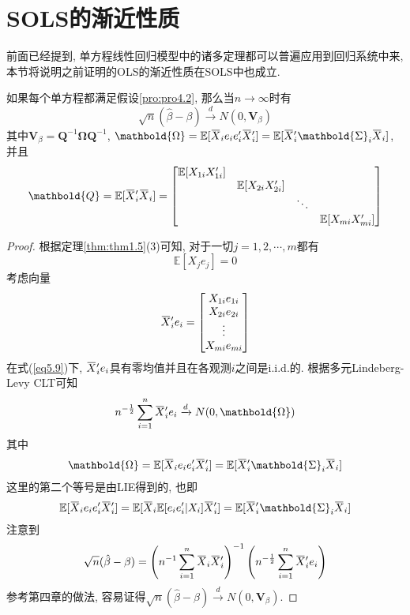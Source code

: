 \documentclass[cn, 12pt, math=mtpro2, bibstyle=apa, blue, twocol]{elegantbook}
\newcommand{\E}{\mathbb{E}}
\newcommand{\Q}{\mathbold{Q}}
\newcommand{\hb}{\hat{\beta}}
\newcommand{\V}{\mathbold{V}}
\newcommand{\overbar}[1]{\mkern 1.5mu\overline{\mkern-1.5mu#1\mkern-1.5mu}\mkern 1.5mu}
\begin{document}
\section{SOLS的渐近性质}
前面已经提到, 单方程线性回归模型中的诸多定理都可以普遍应用到回归系统中来, 本节将说明之前证明的OLS的渐近性质在SOLS中也成立.
\begin{theorem}\label{thm:thm5.1}
  如果每个单方程都满足假设\ref{pro:pro4.2}, 那么当$n\to\infty$时有
  $$\sqrt{n}(\hb-\beta)\xrightarrow{d}N(0,\V_\beta)$$
  其中$\V_\beta=\Q^{-1}\mathbold{\Omega}\Q^{-1}$, $\mathbold{\Omega}=\E[\overbar{X}_ie_ie_i'\overbar{X}_i']=\E[\overbar{X}_i'\mathbold{\Sigma}_i\overbar{X}_i]$, 并且
  $$\Q=\E[\overbar{X}_i'\overbar{X}_i]=\begin{bmatrix}
                                     \E[X_{1i}X_{1i}'] &  &  &  \\
                                      & \E[X_{2i}X_{2i}'] &  &  \\
                                      &  & \ddots &  \\
                                      &  &  & \E[X_{mi}X_{mi}']
                                   \end{bmatrix}$$
\end{theorem}
\begin{proof}
  根据定理\ref{thm:thm1.5}(3)可知, 对于一切$j=1,2,\cdots,m$都有
  \begin{equation}\label{eq5.9}
    \E[X_je_j]=0
  \end{equation}
  考虑向量
  $$\overbar{X}_i'e_i=\begin{bmatrix}
                        X_{1i}e_{1i} \\
                        X_{2i}e_{2i} \\
                        \vdots \\
                        X_{mi}e_{mi}
                      \end{bmatrix}$$
  在式(\ref{eq5.9})下, $\overbar{X}_i'e_i$具有零均值并且在各观测$i$之间是i.i.d.的. 根据多元Lindeberg-Levy CLT可知
  $$n^{-\frac{1}{2}}\sum_{i=1}^{n}\overbar{X}_i'e_i\xrightarrow{d} N(0,\mathbold{\Omega})$$
  其中
  $$\mathbold{\Omega}=\E[\overbar{X}_ie_ie_i'\overbar{X}_i']=\E[\overbar{X}_i'\mathbold{\Sigma}_i\overbar{X}_i]$$
  这里的第二个等号是由LIE得到的, 也即
  $$\E[\overbar{X}_ie_ie_i'\overbar{X}_i']=\E[\overbar{X}_i\E[e_ie_i'|X_i]\overbar{X}_i']=\E[\overbar{X}_i'\mathbold{\Sigma}_i\overbar{X}_i]$$
  注意到
  $$\sqrt{n}(\hb-\beta)=\left(n^{-1}\sum_{i=1}^{n}\overbar{X}_i\overbar{X}_i'\right)^{-1}\left(n^{-\frac{1}{2}}\sum_{i=1}^{n}\overbar{X}_i'e_i\right)$$
  参考第四章的做法, 容易证得$\sqrt{n}(\hb-\beta)\xrightarrow{d}N(0,\V_\beta)$.

\end{proof}
\end{document}

